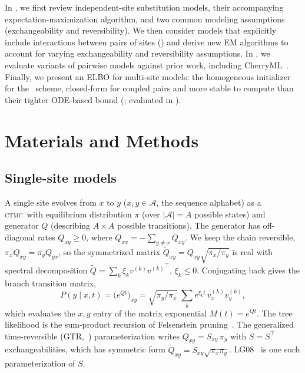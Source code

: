 \documentclass[11pt]{article}
\newcommand{\CTMC}{\textsc{ctmc}}
\newcommand{\Xset}{\mathcal{A}}
\begin{document}
In , we first review independent-site substitution models, their accompanying expectation-maximization algorithm, and two common modeling assumptions (exchangeability and reversibility).
We then consider models that explicitly include interactions between pairs of sites () and derive new EM algorithms to account for varying exchangeability and reversibility assumptions.
In , we evaluate variants of pairwise models against prior work, including CherryML~\citep{Prillo2023CherryML}.
Finally, we present an ELBO for multi-site models: the homogeneous initializer for the~\citet{cohn2010} scheme, closed-form for coupled pairs and more stable to compute than their tighter ODE-based bound (; evaluated in ).

\section{Materials and Methods}
\label{sec:methods}

\subsection{Single-site models}
\label{sec:single}
A single site evolves from $x$ to $y$ ($x,y \in \Xset$, the sequence alphabet) as a \CTMC\ with equilibrium distribution $\pi$ (over  $|\Xset|=A$ possible states) and generator $Q$ (describing $A \times A$ possible transitions).
The generator has off-diagonal rates $Q_{xy}\ge0$, where
$Q_{xx}=-\sum_{y\ne x}Q_{xy}$.
We keep the chain reversible, $\pi_xQ_{xy}=\pi_yQ_{yx}$, so the symmetrized matrix
$\widetilde Q_{xy}=Q_{xy}\sqrt{\pi_x/\pi_y}$ is real with
spectral decomposition $\widetilde Q=\sum_k\xi_k v^{(k)}{v^{(k)}}^\top$,
$\xi_k\le0$. Conjugating back gives the branch transition matrix,
\begin{equation}
\label{eq:pt}
P(y \mid x,t)=\big(e^{Qt}\big)_{xy}=\sqrt{\pi_y/\pi_x}\;\textstyle\sum_k
   e^{\xi_k t}\,v^{(k)}_x v^{(k)}_y,
\end{equation}
which evaluates the $x,y$ entry of the matrix exponential $M(t) = e^{Qt}$.
The tree likelihood is the sum-product recursion of Felsenstein
pruning~\citep{Felsenstein81}.
The generalized time-reversible (GTR,~\citep{tavare1986some}) parameterization writes
$Q_{xy}=S_{xy}\,\pi_y$ with $S=S^\top$ exchangeabilities, which has symmetric form
$\widetilde Q_{xy}=S_{xy}\sqrt{\pi_x\pi_y}$. LG08~\citep{LG08} is one such parameterization of $S$.
\end{document}
